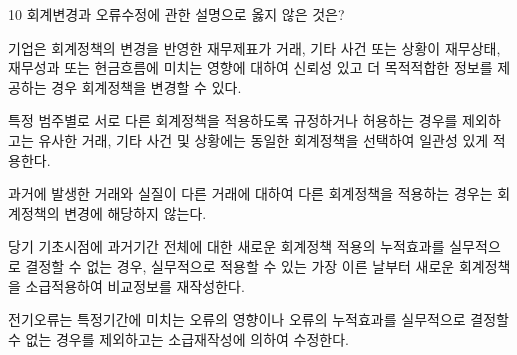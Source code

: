 \begin{question}{10}
회계변경과 오류수정에 관한 설명으로 옳지 않은 것은?
\begin{choices}
  \item 기업은 회계정책의 변경을 반영한 재무제표가 거래, 기타 사건 또는 상황이 재무상태, 재무성과 또는 현금흐름에 미치는 영향에 대하여 신뢰성 있고 더 목적적합한 정보를 제공하는 경우 회계정책을 변경할 수 있다.
  \item 특정 범주별로 서로 다른 회계정책을 적용하도록 규정하거나 허용하는 경우를 제외하고는 유사한 거래, 기타 사건 및 상황에는 동일한 회계정책을 선택하여 일관성 있게 적용한다.
  \item 과거에 발생한 거래와 실질이 다른 거래에 대하여 다른 회계정책을 적용하는 경우는 회계정책의 변경에 해당하지 않는다.
  \item 당기 기초시점에 과거기간 전체에 대한 새로운 회계정책 적용의 누적효과를 실무적으로 결정할 수 없는 경우, 실무적으로 적용할 수 있는 가장 이른 날부터 새로운 회계정책을 소급적용하여 비교정보를 재작성한다.
  \item 전기오류는 특정기간에 미치는 오류의 영향이나 오류의 누적효과를 실무적으로 결정할 수 없는 경우를 제외하고는 소급재작성에 의하여 수정한다.
\end{choices}
\end{question}
